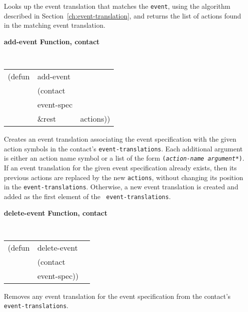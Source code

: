 \documentclass[twoside]{book}
\begin{document}
\begin{sloppy}
{\begin{flushright}
{}\end{flushright}}

\begin{flushright} \parbox[t]{6.125in}{
Looks up the event translation that matches the {\tt event}, using the
algorithm described in Section~\ref{ch:event-translation}, and returns
the list of actions found in the matching event translation.

}\end{flushright}

{\samepage
{\large {\bf add-event \hfill Function, contact}} 
\begin{flushright} \parbox[t]{6.125in}{
\tt
\begin{tabular}{lll}
\raggedright
(defun & add-event & \\ 
& (contact\\
&  event-spec\\
& \&rest & actions))
\end{tabular}
\rm

}\end{flushright}}

\begin{flushright} \parbox[t]{6.125in}{
Creates an event translation associating the event specification with the given 
action symbols in the
contact's {\tt event-translations}.
Each additional argument is either an action name symbol or a list of the form
{\tt ({\em action-name argument*})}. 
If an event translation for the given event specification already exists, then
its previous actions are replaced by the new {\tt actions}, without changing its
position in the {\tt event-translations}. Otherwise, a new event translation is
created and added as the first element of the {\tt
event-translations}. 
}\end{flushright}

{\samepage
{\large {\bf delete-event \hfill Function, contact}}
\begin{flushright} \parbox[t]{6.125in}{
\tt
\begin{tabular}{lll}
\raggedright
(defun & delete-event & \\ 
& (contact\\
&  event-spec))
\end{tabular}
\rm

}\end{flushright}
}

\begin{flushright} \parbox[t]{6.125in}{
Removes any event translation for the event specification  from the
contact's {\tt event-translations}. 

}
\end{flushright}
\end{sloppy}
\end{document}
